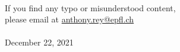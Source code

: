 
\thispagestyle{empty}

\mbox{}
\vfill

\noindent\textsf{\color{mulberry}} \\
\noindent
If you find any typo or misunderstood content,\\
please email at \href{mailto:anthony.rey@epfl.ch}{anthony.rey@epfl.ch}\\

\noindent\textsf{\color{mulberry}} \\
\noindent
December 22, 2021
